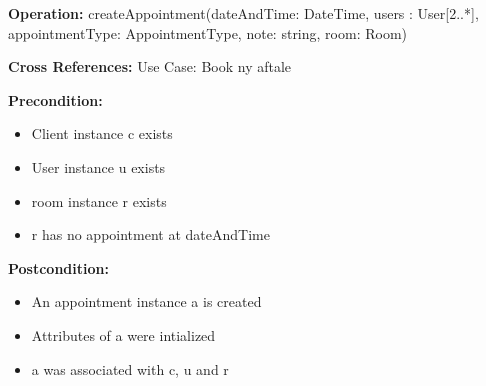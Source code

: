 {\setlength{\parindent}{0cm}
\textbf{Operation:} createAppointment(dateAndTime: DateTime, users : User[2..*], appointmentType: AppointmentType, note: string, room: Room) 

\textbf{Cross References:} Use Case: Book ny aftale 

\textbf{Precondition: }
		\begin{itemize}
			\item Client instance c exists 
			\item User instance u exists 
			\item room instance r exists 
			\item r has no appointment at dateAndTime
		\end{itemize}
		
\textbf{Postcondition:}  
        \begin{itemize}
            \item An appointment instance a is created
            \item Attributes of a were intialized
            \item a was associated with c, u and r
        \end{itemize}
        }
        
